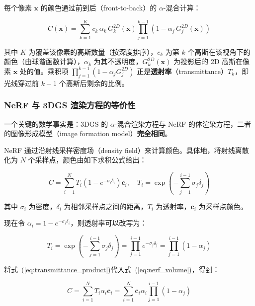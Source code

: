 每个像素 $\mathbf{x}$ 的颜色通过前到后（front-to-back）的 $\alpha$-混合计算：

\begin{equation}
\label{eq:alpha_blending}
C(\mathbf{x}) = \sum_{k=1}^{K} c_k \, \alpha_k \, G_k^{2D}(\mathbf{x}) \prod_{j=1}^{k-1}\left(1 - \alpha_j \, G_j^{2D}(\mathbf{x})\right)
\end{equation}

其中 $K$ 为覆盖该像素的高斯数量（按深度排序），$c_k$ 为第 $k$ 个高斯在该视角下的颜色（由球谐函数计算），$\alpha_k$ 为其不透明度，$G_k^{2D}(\mathbf{x})$ 为投影后的 2D 高斯在像素 $\mathbf{x}$ 处的值。乘积项 $\prod_{j=1}^{k-1}(1-\alpha_j G_j^{2D})$ 正是\textbf{透射率}（transmittance）$T_k$，即光线穿过前 $k-1$ 个高斯后剩余的比例。

\subsubsection{NeRF 与 3DGS 渲染方程的等价性}

一个关键的数学事实是：3DGS 的 $\alpha$-混合渲染方程与 NeRF 的体渲染方程，二者的图像形成模型（image formation model）\textbf{完全相同}。

NeRF 通过沿射线采样密度场（density field）来计算颜色。具体地，将射线离散化为 $N$ 个采样点，颜色由如下求积公式给出：

\begin{equation}
\label{eq:nerf_volume}
C = \sum_{i=1}^{N} T_i \left(1 - e^{-\sigma_i \delta_i}\right) \mathbf{c}_i, \quad T_i = \exp\!\left(-\sum_{j=1}^{i-1} \sigma_j \delta_j\right)
\end{equation}

其中 $\sigma_i$ 为密度，$\delta_i$ 为相邻采样点之间的距离，$T_i$ 为透射率，$\mathbf{c}_i$ 为采样点颜色。

现在令 $\alpha_i = 1 - e^{-\sigma_i \delta_i}$，则透射率可以改写为：

\begin{equation}
\label{eq:transmittance_product}
T_i = \exp\!\left(-\sum_{j=1}^{i-1} \sigma_j \delta_j\right) = \prod_{j=1}^{i-1} e^{-\sigma_j \delta_j} = \prod_{j=1}^{i-1}(1 - \alpha_j)
\end{equation}

将式~(\ref{eq:transmittance_product})代入式~(\ref{eq:nerf_volume})，得到：

\begin{equation}
\label{eq:nerf_alpha}
C = \sum_{i=1}^{N} T_i \alpha_i \mathbf{c}_i = \sum_{i=1}^{N} \mathbf{c}_i \alpha_i \prod_{j=1}^{i-1}(1 - \alpha_j)
\end{equation}

